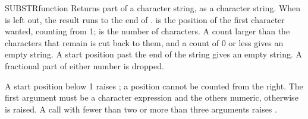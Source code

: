 \begin{XbaseEntry}{SUBSTR}{function}
Returns part of a character string, as a character string.
\Syntax
{}
\Defaults
When  is left out, the result runs to the end of .
\Usage
{} is the position of the first character wanted, counting from 1;  is the number of characters. A count larger than the characters that remain is cut back to them, and a count of 0 or less gives an empty string. A start position past the end of the string gives an empty string. A fractional part of either number is dropped.

A start position below 1 raises ; a position cannot be counted from the right. The first argument must be a character expression and the others numeric, otherwise  is raised. A call with fewer than two or more than three arguments raises .
\Examples
{}
\end{XbaseEntry}

